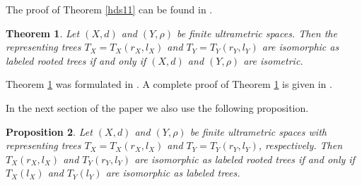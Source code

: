 \documentclass{raex}
\newtheorem{thm}{Theorem}[section]
\newtheorem{prop}[thm]{Proposition}
\theoremstyle{definition}
\theoremstyle{remark}
\numberwithin{equation}{section}
\begin{document}
The proof of Theorem \ref{hds11}
can be found in \cite[Theorem 2.7]{DP2018pNUAA}.



\begin{thm}\label{rvqqbb}
Let $(X,d)$ and $(Y,\rho)$ be  finite ultrametric spaces. Then the representing trees
$T_X=T_X(r_X,
l_X)$ and $T_Y=T_Y(r_Y,l_Y)$ are isomorphic as labeled rooted trees if and only if
$(X,d)$ and $(Y,\rho)$ are isometric.
\end{thm}


Theorem \ref{rvqqbb} was formulated in \cite[Theorem 2.6]{DPT2017FPTA}.
A complete proof of Theorem \ref{rvqqbb} is given in \cite[Theorem 1.10]{DP2018pNUAA}.



In the next section of the paper we also use the following proposition.

\begin{prop}\label{effrt}
Let $(X,d)$ and $(Y,\rho)$ be finite ultrametric spaces with  representing trees $T_X=T_X(r_X,l_X)$ and $T_Y=T_Y(r_Y,l_Y)$, respectively. Then 
\(
T_X(r_X,l_X)
\) and \(
T_Y(r_Y,l_Y)
\)
are isomorphic as labeled rooted trees if and only if
\(
T_X(l_X)
\) and
\(T_Y(l_Y)
\)
are isomorphic as labeled trees.
\end{prop}
\end{document}
